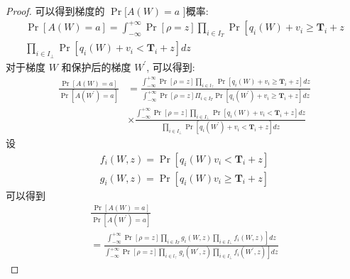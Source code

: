 \begin{proof}
可以得到梯度的 $\operatorname{Pr}[A(W)=a$ ]概率:
\begin{equation}
\begin{array}{l}
\operatorname{Pr}[A(W)=a]=\int_{-\infty}^{+\infty} \operatorname{Pr}[\rho=z] \prod_{i \in I_{T}} \operatorname{Pr}\left[q_{i}(W)+v_{i} \geq \boldsymbol{T}_{i}+z\right. \\
\prod_{i \in I_{\perp}} \operatorname{Pr}\left[q_{i}(W)+v_{i}<\boldsymbol{T}_{i}+z\right] d z
\end{array}
\end{equation}
对于梯度 $W$ 和保护后的梯度 $W^{\prime}$, 可以得到:
\begin{equation}
\begin{aligned}
\frac{\operatorname{Pr}[A(W)=a]}{\operatorname{Pr}\left[A\left(W^{\prime}\right)=a\right]} &=\frac{\int_{-\infty}^{+\infty} \operatorname{Pr}[\rho=z] \prod_{i \in l_{\top}} \operatorname{Pr}\left[q_{i}(W)+v_{i} \geq \boldsymbol{T}_{i}+z\right] d z}{\int_{-\infty}^{+\infty} \operatorname{Pr}[\rho=z] \Pi_{i \in I_{T}} \operatorname{Pr}\left[q_{i}\left(W^{\prime}\right)+v_{i} \geq \boldsymbol{T}_{i}+z\right] d z} \\
& \times \frac{\int_{-\infty}^{+\infty} \operatorname{Pr}[\rho=z] \prod_{i \in I_{\perp}} \operatorname{Pr}\left[q_{i}(W)+v_{i}<\boldsymbol{T}_{i}+z\right] d z}{\prod_{i \in I_{\perp}} \operatorname{Pr}\left[q_{i}\left(W^{\prime}\right)+v_{i}<\boldsymbol{T}_{i}+z\right] d z}
\end{aligned}
\end{equation}
设
\begin{equation}
\begin{array}{l}
f_{i}(W, z)=\operatorname{Pr}\left[q_{i}(W) v_{i}<\boldsymbol{T}_{i}+z\right] \\
g_{i}(W, z)=\operatorname{Pr}\left[q_{i}(W) v_{i} \geq \boldsymbol{T}_{i}+z\right]
\end{array}
\end{equation}
可以得到
\begin{equation}
\begin{array}{c}
\frac{\operatorname{Pr}[A(W)=a]}{\operatorname{Pr}\left[A\left(W^{\prime}\right)=a\right]} \\
=\frac{\left.\int_{-\infty}^{+\infty} \operatorname{Pr}[\rho=z] \prod_{i \in I_{T}} g_{i}(W, z) \prod_{i \in I_{\perp}} f_{i}(W, z)\right] d z}{\left.\int_{-\infty}^{+\infty} \operatorname{Pr}[\rho=z] \prod_{i \in l_{\top}} g_{i}\left(W^{\prime}, z\right) \prod_{i \in I_{\perp}} f_{i}\left(W^{\prime}, z\right)\right] d z}
\end{array}
\end{equation}
\end{proof}
































